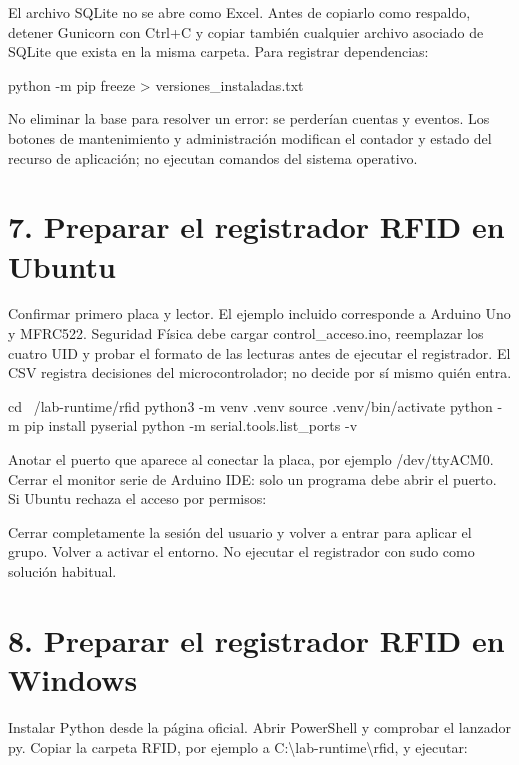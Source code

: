 \documentclass[12pt,a4paper]{article}
\begin{document}
El archivo SQLite no se abre como Excel. Antes de copiarlo como respaldo, detener Gunicorn con Ctrl+C y copiar también cualquier archivo asociado de SQLite que exista en la misma carpeta. Para registrar dependencias:\par
{}
\begin{Comandos}
python -m pip freeze > versiones_instaladas.txt
\end{Comandos}
No eliminar la base para resolver un error: se perderían cuentas y eventos. Los botones de mantenimiento y administración modifican el contador y estado del recurso de aplicación; no ejecutan comandos del sistema operativo.\par
{}\section*{7. Preparar el registrador RFID en Ubuntu}
Confirmar primero placa y lector. El ejemplo incluido corresponde a Arduino Uno y MFRC522. Seguridad Física debe cargar \textnormal{control\_\allowbreak{}acceso.ino}, reemplazar los cuatro UID y probar el formato de las lecturas antes de ejecutar el registrador. El CSV registra decisiones del microcontrolador; no decide por sí mismo quién entra.\par
{}
\begin{Comandos}
cd ~/lab-runtime/rfid
python3 -m venv .venv
source .venv/bin/activate
python -m pip install pyserial
python -m serial.tools.list_ports -v
\end{Comandos}
Anotar el puerto que aparece al conectar la placa, por ejemplo \textnormal{/\allowbreak{}dev/\allowbreak{}ttyACM0}. Cerrar el monitor serie de Arduino IDE: solo un programa debe abrir el puerto. Si Ubuntu rechaza el acceso por permisos:\par
{}
Cerrar completamente la sesión del usuario y volver a entrar para aplicar el grupo. Volver a activar el entorno. No ejecutar el registrador con \textnormal{sudo} como solución habitual.\par
{}\section*{8. Preparar el registrador RFID en Windows}
Instalar Python desde la página oficial. Abrir PowerShell y comprobar el lanzador \textnormal{py}. Copiar la carpeta RFID, por ejemplo a \textnormal{C:\textbackslash{}lab-runtime\textbackslash{}rfid}, y ejecutar:\par
\end{document}
